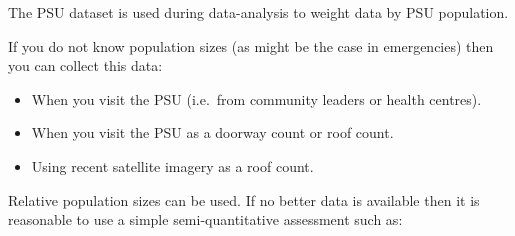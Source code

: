 \documentclass[12pt,a4paper]{book}
\begin{document}
The PSU dataset is used during data-analysis to weight data by PSU population.

If you do not know population sizes (as might be the case in emergencies) then you can collect this data:

\begin{itemize}
\item
  When you visit the PSU (i.e.~from community leaders or health centres).
\item
  When you visit the PSU as a doorway count or roof count.
\item
  Using recent satellite imagery as a roof count.
\end{itemize}

Relative population sizes can be used. If no better data is available then it is reasonable to use a simple semi-quantitative assessment such as:
\end{document}
